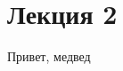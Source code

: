 \documentclass[10pt, a4paper]{article}
\begin{document}
\section[*]{Лекция 2}

Привет, медвед
\end{document}

